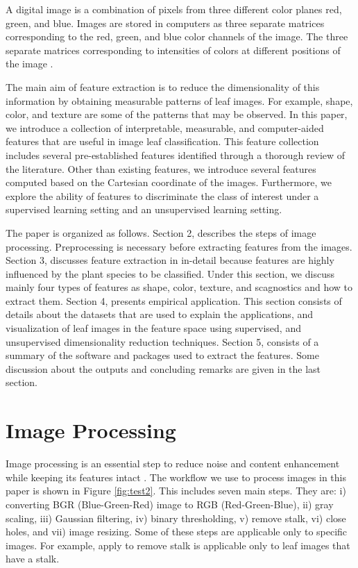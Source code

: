 \documentclass{article}
\begin{document}
   A digital image is a combination of pixels from three different color planes red, green, and blue. Images are stored in computers as three separate matrices corresponding to the red, green, and blue color channels of the image. The three separate matrices corresponding to intensities of colors at different positions of the image \citep{book1}.

  The main aim of feature extraction is to reduce the dimensionality of this information by obtaining measurable patterns of leaf images. For example, shape, color, and texture are some of the patterns that may be observed. In this paper, we introduce a collection of interpretable, measurable, and computer-aided features that are useful in image leaf classification. This feature collection includes several pre-established features identified through a thorough review of the literature.  Other than existing features, we introduce several features computed based on the Cartesian coordinate of the images.  Furthermore, we explore the ability of features to discriminate the class of interest under a supervised learning setting and an unsupervised learning setting.

     The paper is organized as follows. Section 2, describes the steps of image processing. Preprocessing is necessary before extracting features from the images. Section 3, discusses feature extraction in in-detail because features are highly influenced by the plant species to be classified. Under this section, we discuss mainly four types of features as shape, color, texture, and scagnostics and how to extract them. Section 4, presents empirical application. This section consists of details about the datasets that are used to explain the applications, and visualization of leaf images in the feature space using supervised, and unsupervised dimensionality reduction techniques. Section 5, consists of a summary of the software and packages used to extract the features. Some discussion about the outputs and concluding remarks are given in the last section.

\section{Image Processing}


      Image processing is an essential step to reduce noise and content enhancement while keeping its features intact \citep{8675114}. The workflow we use to process images in this paper is shown in Figure \ref{fig:test2}. This includes seven main steps. They are: i) converting BGR (Blue-Green-Red) image to RGB (Red-Green-Blue), ii) gray scaling, iii) Gaussian filtering, iv) binary thresholding, v) remove stalk, vi) close holes, and vii) image resizing. Some of these steps are applicable only to specific images. For example,  apply to remove stalk is applicable only to leaf images that have a stalk.
\end{document}
